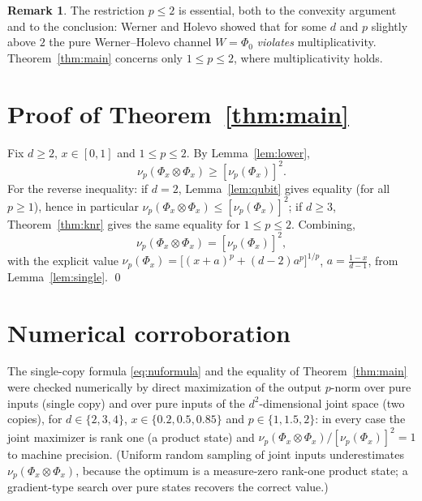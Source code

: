 \documentclass{amsart}
\theoremstyle{definition}
\newtheorem{remark}{Remark}
\begin{document}
\begin{remark}
The restriction $p\le2$ is essential, both to the convexity argument and to the
conclusion: Werner and Holevo showed that for some $d$ and $p$ slightly above
$2$ the pure Werner--Holevo channel $W=\Phi_0$ \emph{violates} multiplicativity.
Theorem~\ref{thm:main} concerns only $1\le p\le2$, where multiplicativity holds.
\end{remark}

\section{Proof of Theorem~\ref{thm:main}}

Fix $d\ge2$, $x\in[0,1]$ and $1\le p\le2$. By Lemma~\ref{lem:lower},
\[
\nu_p(\Phi_x\otimes\Phi_x)\ge[\nu_p(\Phi_x)]^{2}.
\]
For the reverse inequality: if $d=2$, Lemma~\ref{lem:qubit} gives equality (for
all $p\ge1$), hence in particular $\nu_p(\Phi_x\otimes\Phi_x)\le[\nu_p(\Phi_x)]^2$;
if $d\ge3$, Theorem~\ref{thm:knr} gives the same equality for $1\le p\le2$.
Combining,
\[
\nu_p(\Phi_x\otimes\Phi_x)=[\nu_p(\Phi_x)]^{2},
\]
with the explicit value
$\nu_p(\Phi_x)=\bigl[(x+a)^{p}+(d-2)a^{p}\bigr]^{1/p}$, $a=\tfrac{1-x}{d-1}$,
from Lemma~\ref{lem:single}. \qed

\section{Numerical corroboration}

The single-copy formula \eqref{eq:nuformula} and the equality of
Theorem~\ref{thm:main} were checked numerically by direct maximization of the
output $p$-norm over pure inputs (single copy) and over pure inputs of the
$d^{2}$-dimensional joint space (two copies), for $d\in\{2,3,4\}$,
$x\in\{0.2,0.5,0.85\}$ and $p\in\{1,1.5,2\}$: in every case the joint
maximizer is rank one (a product state) and
$\nu_p(\Phi_x\otimes\Phi_x)/[\nu_p(\Phi_x)]^{2}=1$ to machine precision.
(Uniform random sampling of joint inputs underestimates
$\nu_p(\Phi_x\otimes\Phi_x)$, because the optimum is a measure-zero rank-one
product state; a gradient-type search over pure states recovers the correct
value.)
\end{document}
